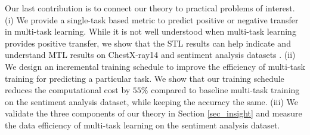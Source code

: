 Our last contribution is to connect our theory to practical problems of interest.
(i) We provide a single-task based metric to predict positive or negative transfer in multi-task learning.
While it is not well understood when multi-task learning provides positive transfer, we show that the STL results can help indicate and understand MTL results on ChestX-ray14 \cite{chexnet17} and sentiment analysis datasets \cite{LZWDA18}.
(ii) We design an incremental training schedule to improve the efficiency of multi-task training for predicting a particular task.
We show that our training schedule reduces the computational cost by $55\%$ compared to baseline multi-task training on the sentiment analysis dataset, while keeping the accuracy the same.
(iii) We validate the three components of our theory in Section \ref{sec_insight} and measure the data efficiency of multi-task learning on the sentiment analysis dataset.

